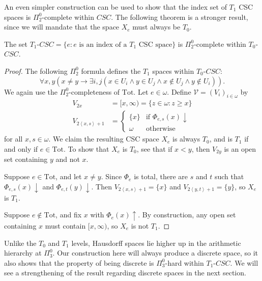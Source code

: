 \documentclass[11pt]{amsart}
\theoremstyle{remark}
\begin{document}
An even simpler construction can be used to show that the index set of $T_1$ CSC spaces is $\Pi^0_2$-complete within $CSC$. The following theorem is a stronger result, since we will mandate that the space $X_e$ must always be $T_0$.

\begin{theorem}\label{thm:T1Completeness}
    The set $T_1$-$CSC = \{e : \text{$e$ is an index of a $T_1$ CSC space}\}$ is $\Pi^0_2$-complete within $T_0$-$CSC$.
\end{theorem}
\begin{proof}
    The following $\Pi^0_2$ formula defines the $T_1$ spaces within $T_0$-$CSC$:
    \begin{equation*}
        \forall x, y (x \neq y \rightarrow \exists i, j(x \in U_i \land y \in U_j \land x \notin U_j \land y \notin U_i)).
    \end{equation*}
    We again use the $\Pi^0_2$-completeness of $\mathrm{Tot}$. Let $e \in \omega$. Define $\mathcal{V} = (V_i)_{i \in \omega}$ by
    \begin{align*}
        V_{2x} &= [x, \infty) = \{z \in \omega : z \geq x\}\\
        V_{2\left\langle x, s \right\rangle + 1} &= \begin{cases}
            \{x\} & \text{if $\Phi_{e, s}(x)\downarrow$}\\
            \omega & \text{otherwise}
        \end{cases}
    \end{align*}
    for all $x, s \in \omega$. We claim the resulting CSC space $X_e$ is always $T_0$, and is $T_1$ if and only if $e \in \mathrm{Tot}$. To show that $X_e$ is $T_0$, see that if $x < y$, then $V_{2y}$ is an open set containing $y$ and not $x$.

    Suppose $e \in \mathrm{Tot}$, and let $x \neq y$. Since $\Phi_e$ is total, there are $s$ and $t$ such that $\Phi_{e, s}(x) \downarrow$ and $\Phi_{e, t}(y) \downarrow$. Then $V_{2\left\langle x, s \right\rangle + 1} = \{x\}$ and $V_{2\left\langle y, t \right\rangle + 1} = \{y\}$, so $X_e$ is $T_1$.

    Suppose $e \notin \mathrm{Tot}$, and fix $x$ with $\Phi_e(x) \uparrow$. By construction, any open set containing $x$ must contain $[x, \infty)$, so $X_e$ is not $T_1$.
\end{proof}

Unlike the $T_0$ and $T_1$ levels, Hausdorff spaces lie higher up in the arithmetic hierarchy at $\Pi_3^0$.
Our construction here will always produce a discrete space, so it also shows that the property of being discrete is $\Pi_3^0$-hard within $T_1$-$CSC$.
We will see a strengthening of the result regarding discrete spaces in the next section.
\end{document}
